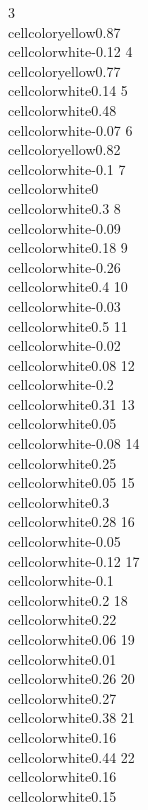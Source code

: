 \documentclass{article}\usepackage[]{graphicx}\usepackage[]{color}
\begin{document}
3  \\cellcolor{yellow}{0.87} \\cellcolor{white}{-0.12}
4  \\cellcolor{yellow}{0.77}  \\cellcolor{white}{0.14}
5   \\cellcolor{white}{0.48} \\cellcolor{white}{-0.07}
6  \\cellcolor{yellow}{0.82}  \\cellcolor{white}{-0.1}
7      \\cellcolor{white}{0}   \\cellcolor{white}{0.3}
8  \\cellcolor{white}{-0.09}  \\cellcolor{white}{0.18}
9  \\cellcolor{white}{-0.26}   \\cellcolor{white}{0.4}
10 \\cellcolor{white}{-0.03}   \\cellcolor{white}{0.5}
11 \\cellcolor{white}{-0.02}  \\cellcolor{white}{0.08}
12  \\cellcolor{white}{-0.2}  \\cellcolor{white}{0.31}
13  \\cellcolor{white}{0.05} \\cellcolor{white}{-0.08}
14  \\cellcolor{white}{0.25}  \\cellcolor{white}{0.05}
15   \\cellcolor{white}{0.3}  \\cellcolor{white}{0.28}
16 \\cellcolor{white}{-0.05} \\cellcolor{white}{-0.12}
17  \\cellcolor{white}{-0.1}   \\cellcolor{white}{0.2}
18  \\cellcolor{white}{0.22}  \\cellcolor{white}{0.06}
19  \\cellcolor{white}{0.01}  \\cellcolor{white}{0.26}
20  \\cellcolor{white}{0.27}  \\cellcolor{white}{0.38}
21  \\cellcolor{white}{0.16}  \\cellcolor{white}{0.44}
22  \\cellcolor{white}{0.16}  \\cellcolor{white}{0.15}
\end{document}
